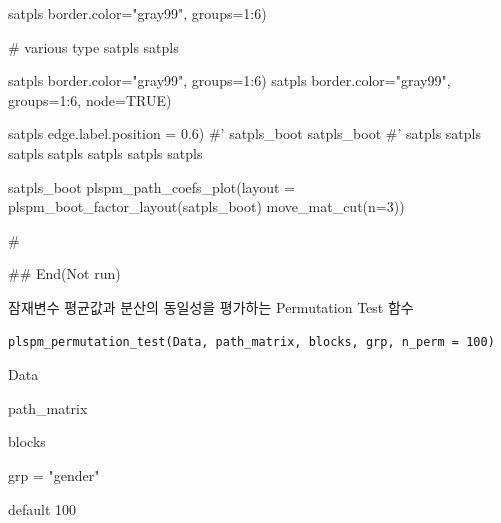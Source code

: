 \documentclass[a4paper]{book}
\begin{document}
\begin{Examples}
\begin{ExampleCode}
satpls %
                            border.color="gray99", groups=1:6)


# various type
satpls %
satpls %

satpls %
                                 border.color="gray99", groups=1:6)
satpls %
                                 border.color="gray99", groups=1:6, node=TRUE)

satpls %
                                 edge.label.position = 0.6)
#'
satpls_boot%
satpls_boot%
#'
satpls %
satpls %
satpls %
satpls %
satpls %
satpls %
satpls %

satpls_boot %
plspm_path_coefs_plot(layout =  plspm_boot_factor_layout(satpls_boot)%
 move_mat_cut(n=3))

#



## End(Not run)
\end{ExampleCode}
\end{Examples}
%
\begin{Description}
잠재변수 평균값과 분산의 동일성을 평가하는 Permutation Test 함수
\end{Description}
%
\begin{Usage}
\begin{verbatim}
plspm_permutation_test(Data, path_matrix, blocks, grp, n_perm = 100)
\end{verbatim}
\end{Usage}
%
\begin{Arguments}
\begin{ldescription}
\item[\code{Data}] Data

\item[\code{path\_matrix}] path\_matrix

\item[\code{blocks}] blocks

\item[\code{grp}] grp = "gender"

\item[\code{n\_perm}] default 100
\end{ldescription}
\end{Arguments}
\end{document}
